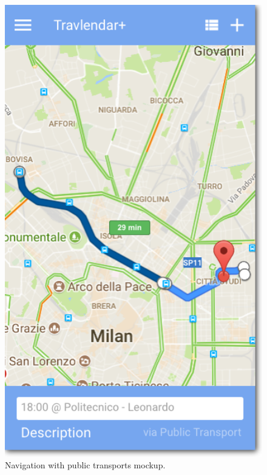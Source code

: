 \begin{figure}
	\centering
	\includegraphics[width=4.5in]{./images/map_pt.png}
	\caption{Navigation with public transports mockup.}
	\label{fig:MockupMapPt}
\end{figure}

